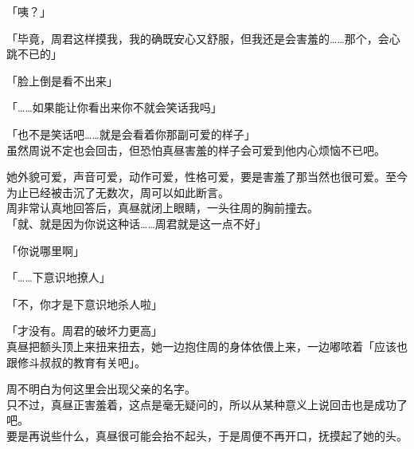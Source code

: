 「咦？」

「毕竟，周君这样摸我，我的确既安心又舒服，但我还是会害羞的……那个，会心跳不已的」

「脸上倒是看不出来」

「……如果能让你看出来你不就会笑话我吗」

「也不是笑话吧……就是会看着你那副可爱的样子」\\

虽然周说不定也会回击，但恐怕真昼害羞的样子会可爱到他内心烦恼不已吧。

她外貌可爱，声音可爱，动作可爱，性格可爱，要是害羞了那当然也很可爱。至今为止已经被击沉了无数次，周可以如此断言。\\

周非常认真地回答后，真昼就闭上眼睛，一头往周的胸前撞去。\\

「就、就是因为你说这种话……周君就是这一点不好」

「你说哪里啊」

「……下意识地撩人」

「不，你才是下意识地杀人啦」

「才没有。周君的破坏力更高」\\

真昼把额头顶上来扭来扭去，她一边抱住周的身体依偎上来，一边嘟哝着「应该也跟修斗叔叔的教育有关吧」。

周不明白为何这里会出现父亲的名字。\\

只不过，真昼正害羞着，这点是毫无疑问的，所以从某种意义上说回击也是成功了吧。\\

要是再说些什么，真昼很可能会抬不起头，于是周便不再开口，抚摸起了她的头。
